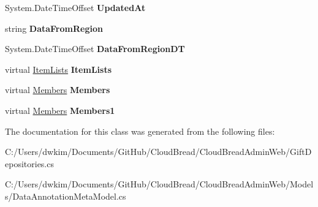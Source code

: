 \begin{DoxyCompactItemize}
\item 
System.\+Date\+Time\+Offset {\bfseries Updated\+At}\hypertarget{class_cloud_bread_admin_web_1_1_gift_depositories_a857bd29f955696106cbe25c9bc37d7ae}{}\label{class_cloud_bread_admin_web_1_1_gift_depositories_a857bd29f955696106cbe25c9bc37d7ae}

\item 
string {\bfseries Data\+From\+Region}\hypertarget{class_cloud_bread_admin_web_1_1_gift_depositories_a5726782f5a6932f232393bdb9df4190c}{}\label{class_cloud_bread_admin_web_1_1_gift_depositories_a5726782f5a6932f232393bdb9df4190c}

\item 
System.\+Date\+Time\+Offset {\bfseries Data\+From\+Region\+DT}\hypertarget{class_cloud_bread_admin_web_1_1_gift_depositories_a8ed62b55fc18a4419620138693a321e0}{}\label{class_cloud_bread_admin_web_1_1_gift_depositories_a8ed62b55fc18a4419620138693a321e0}

\item 
virtual \hyperlink{class_cloud_bread_admin_web_1_1_item_lists}{Item\+Lists} {\bfseries Item\+Lists}\hypertarget{class_cloud_bread_admin_web_1_1_gift_depositories_a7217ae90802d5d8f4e247995ae04c122}{}\label{class_cloud_bread_admin_web_1_1_gift_depositories_a7217ae90802d5d8f4e247995ae04c122}

\item 
virtual \hyperlink{class_cloud_bread_admin_web_1_1_members}{Members} {\bfseries Members}\hypertarget{class_cloud_bread_admin_web_1_1_gift_depositories_a4b30bddd0e473bb3435fab0027792c06}{}\label{class_cloud_bread_admin_web_1_1_gift_depositories_a4b30bddd0e473bb3435fab0027792c06}

\item 
virtual \hyperlink{class_cloud_bread_admin_web_1_1_members}{Members} {\bfseries Members1}\hypertarget{class_cloud_bread_admin_web_1_1_gift_depositories_a8b402150625f5539b7f609dac10630e0}{}\label{class_cloud_bread_admin_web_1_1_gift_depositories_a8b402150625f5539b7f609dac10630e0}

\end{DoxyCompactItemize}


The documentation for this class was generated from the following files\+:\begin{DoxyCompactItemize}
\item 
C\+:/\+Users/dwkim/\+Documents/\+Git\+Hub/\+Cloud\+Bread/\+Cloud\+Bread\+Admin\+Web/Gift\+Depositories.\+cs\item 
C\+:/\+Users/dwkim/\+Documents/\+Git\+Hub/\+Cloud\+Bread/\+Cloud\+Bread\+Admin\+Web/\+Models/Data\+Annotation\+Meta\+Model.\+cs\end{DoxyCompactItemize}
